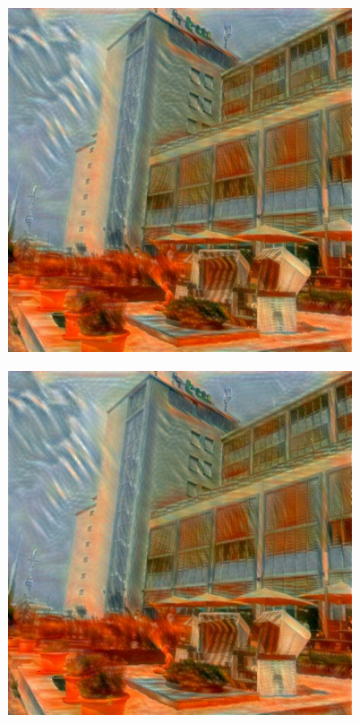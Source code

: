 \begin{figure}[H]
    \centering
    \begin{subfigure}[h]{0.15\textwidth}
        \centering
        \includegraphics[width=\textwidth]{resources/content/experiments/b__the_scream__768x768__style-weight_1e+07__tv-weight_1e-07.jpg}
    \end{subfigure}
    \begin{subfigure}[h]{0.15\textwidth}
        \centering
        \includegraphics[width=\textwidth]{resources/content/experiments/b__the_scream__768x768__style-weight_1e+07__tv-weight_1e-06.jpg}

\end{subfigure}
\end{figure}
